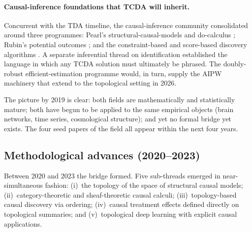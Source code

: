 \paragraph{Causal-inference foundations that TCDA will inherit.}
Concurrent with the TDA timeline, the causal-inference community
consolidated around three programmes: Pearl's structural-causal-models
and do-calculus \citep{pearl1995causal,pearl2009causality,pearl2018book};
Rubin's potential outcomes \citep{rubin1974estimating,rubin2005causal,
imbens2015causal}; and the constraint-based and score-based discovery
algorithms \citep{spirtes2001causation,meek1995strong,peters2014causal,
shimizu2006lingam}. A separate inferential thread on identification
\citep{tian2000probabilities,tian2002general,avin2005identifiability}
established the language in which any TCDA solution must ultimately be
phrased. The doubly-robust efficient-estimation programme
\citep{robins1989probability,chernozhukov2018double,kennedy2016semiparametric}
would, in turn, supply the AIPW machinery that \citet{kim2026topological}
extend to the topological setting in 2026.

The picture by 2019 is clear: both fields are mathematically and
statistically mature; both have begun to be applied to the same
empirical objects (brain networks, time series, cosmological structure);
and yet no formal bridge yet exists. The four seed papers of the field
all appear within the next four years.

\subsection{Methodological advances (2020--2023)}\label{sec:lit_method}

Between 2020 and 2023 the bridge formed. Five sub-threads emerged in
near-simultaneous fashion: (i)~the topology of the space of structural
causal models; (ii)~category-theoretic and sheaf-theoretic causal
calculi; (iii)~topology-based causal discovery via ordering; (iv)~causal
treatment effects defined directly on topological summaries; and
(v)~topological deep learning with explicit causal applications.

